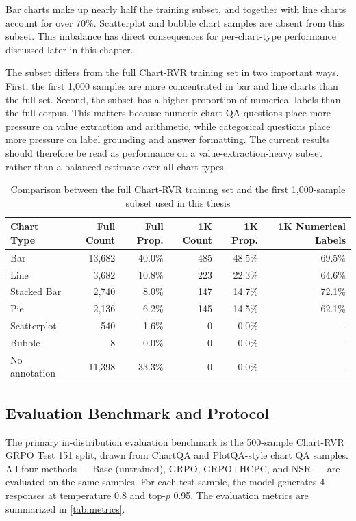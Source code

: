 \documentclass{iutbscthesis}
\begin{document}
Bar charts make up nearly half the training subset, and together with line charts account for over 70\%. Scatterplot and bubble chart samples are absent from this subset. This imbalance has direct consequences for per-chart-type performance discussed later in this chapter.

The subset differs from the full Chart-RVR training set in two important ways. First, the first 1,000 samples are more concentrated in bar and line charts than the full set. Second, the subset has a higher proportion of numerical labels than the full corpus. This matters because numeric chart QA questions place more pressure on value extraction and arithmetic, while categorical questions place more pressure on label grounding and answer formatting. The current results should therefore be read as performance on a value-extraction-heavy subset rather than a balanced estimate over all chart types.

\begin{table}[H]
    \centering
    \small
    \begin{tabular}{lrrrrr}
        \toprule
        Chart Type & Full Count & Full Prop. & 1K Count & 1K Prop. & 1K Numerical Labels \\
        \midrule
        Bar & 13,682 & 40.0\% & 485 & 48.5\% & 69.5\% \\
        Line & 3,682 & 10.8\% & 223 & 22.3\% & 64.6\% \\
        Stacked Bar & 2,740 & 8.0\% & 147 & 14.7\% & 72.1\% \\
        Pie & 2,136 & 6.2\% & 145 & 14.5\% & 62.1\% \\
        Scatterplot & 540 & 1.6\% & 0 & 0.0\% & -- \\
        Bubble & 8 & 0.0\% & 0 & 0.0\% & -- \\
        No annotation & 11,398 & 33.3\% & 0 & 0.0\% & -- \\
        \bottomrule
    \end{tabular}
    \caption{Comparison between the full Chart-RVR training set and the first 1,000-sample subset used in this thesis}
    \label{tab:full_vs_subset}
\end{table}

\subsection{Evaluation Benchmark and Protocol}

The primary in-distribution evaluation benchmark is the 500-sample Chart-RVR GRPO Test 151 split, drawn from ChartQA and PlotQA-style chart QA samples. All four methods --- Base (untrained), GRPO, GRPO+HCPC, and NSR --- are evaluated on the same samples. For each test sample, the model generates 4 responses at temperature 0.8 and top-$p$ 0.95. The evaluation metrics are summarized in \autoref{tab:metrics}.
\end{document}
